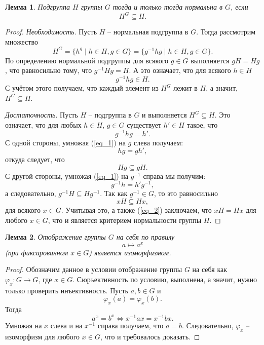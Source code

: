 \documentclass{article}
\newtheorem{lemma}{Лемма}[section]
\begin{document}
\begin{lemma}
    Подгруппа $H$ группы $G$ тогда и только тогда нормальна в $G$, если $$ H^G \subseteq H. $$
\end{lemma}
\begin{proof}
    \textit{Необходимость}. Пусть $H$ -- нормальная подгруппа в $G$. Тогда рассмотрим множество $$ H^G = \{ h^g \mid h \in H, g \in G \} = \{ g^{-1} h g \mid h \in H, g \in G \}. $$ По определению нормальной подгруппы для всякого $g \in G$ выполняется $ gH=Hg $, что равносильно тому, что $g^{-1}Hg = H$. А это означает, что для всякого $h \in H$ $$g^{-1}hg \in H. $$ С учётом этого получаем, что каждый элемент из $H^G$ лежит  в $H$, а значит, $H^G \subseteq H$.

    \textit{Достаточность}. Пусть $H$ -- подгруппа в $G$ и выполняется $H^G \subseteq H$. Это означает, что для любых $h \in H$, $g \in G$ существует $h' \in H$ такое, что 
    \begin{equation} \label{eq_1}
        g^{-1} h g = h'.
    \end{equation}
    С одной стороны, умножая (\ref{eq_1}) на $g$ слева получаем: $$ hg = g h', $$ откуда следует, что
    \begin{equation} \label{eq_2}
        Hg \subseteq gH.
    \end{equation}
    С другой стороны, умножая (\ref{eq_1}) на $g^{-1}$ справа мы получим: $$ g^{-1} h = h' g^{-1}, $$ а следовательно, $g^{-1} H \subseteq H g^{-1}$. Так как $g^{-1} \in G$, то это равносильно $$ xH \subseteq Hx, $$ для всякого $x \in G$. Учитывая это, а также (\ref{eq_2}) заключаем, что $xH = Hx$ для любого $x \in G$, что и является критерием нормальности группы $H$. 
\end{proof}

\begin{lemma}
    Отображение группы $G$ на себя по правилу $$ a \mapsto a^x $$ (при фиксированном $x \in G$) является изоморфизмом.
\end{lemma}
\begin{proof}
    Обозначим данное в условии отображение группы $G$ на себя как $ \varphi_x: G \rightarrow G $, где $x \in G$. Сюръективность по условию, выполнена, а значит, нужно только проверить инъективность. Пусть $a, b \in G$ и $$\varphi_x (a) = \varphi_x(b).$$ Тогда $$ a^x = b^x \Leftrightarrow x^{-1} a x = x^{-1} b x.$$ Умножая на $x$ слева и на $x^{-1}$ справа получаем, что $a = b$. Следовательно, $\varphi_x$ -- изоморфизм для любого $x \in G$, что и требовалось доказать.
\end{proof}
\end{document}
